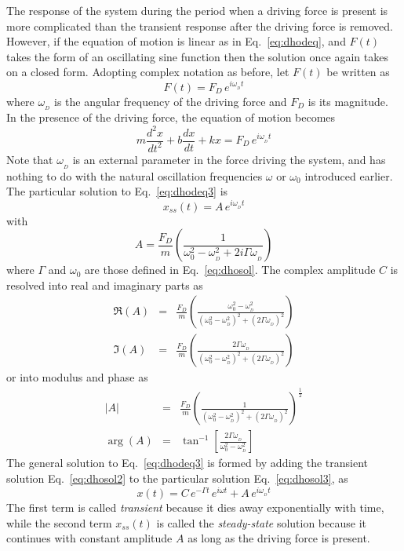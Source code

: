 \documentclass{revtex4}
\begin{document}
The response of the system during the period when a driving force is
present is more complicated than the transient response after the driving
force is removed.  However, if the equation of motion is linear as in
Eq.~\ref{eq:dhodeq}, and $F(t)$ takes the form of an oscillating sine
function then the solution once again takes on a closed form.  Adopting
complex notation as before, let $F(t)$ be written as
\begin{equation}
F(t) = F_D\,e^{i\omega_{_D} t}
\label{eq:F}
\end{equation}
where $\omega_{_D}$ is the angular frequency of the driving force and $F_D$
is its magnitude.  In the presence of the driving force, the equation of
motion becomes
\begin{equation}
m\frac{d^2 x}{dt^2}+b\frac{dx}{dt} + kx = F_D\,e^{i\omega_{_D} t}
\label{eq:dhodeq3}
\end{equation}
Note that $\omega_{_D}$ is an external parameter in the force driving
the system, and has nothing to do with the natural oscillation frequencies
$\omega$ or $\omega_0$ introduced earlier.  The particular solution to
Eq.~\ref{eq:dhodeq3} is
\begin{equation}
x_{ss}(t)=A\,e^{i\omega_{_D} t}
\label{eq:dhosol3}
\end{equation}
with
\begin{equation}
A=\frac{F_D}{m}\left(\frac{1}{\omega_0^2-\omega_{_D}^2+2i\Gamma\omega_{_D}}\right)
\label{eq:Aofw}
\end{equation}
where $\Gamma$ and $\omega_0$ are those defined in Eq.~\ref{eq:dhosol}.
The complex amplitude $C$ is resolved into real and imaginary parts as
\begin{eqnarray}
\Re(A)&=&\frac{F_D}{m}\left(\frac{\omega_0^2-\omega_{_D}^2}
{(\omega_0^2-\omega_{_D}^2)^2+(2\Gamma\omega_{_D})^2}\right) \nonumber \\
\Im(A)&=&\frac{F_D}{m}\left(\frac{2\Gamma\omega_{_D}}
{(\omega_0^2-\omega_{_D}^2)^2+(2\Gamma\omega_{_D})^2}\right)
\label{eq:AofwRI}
\end{eqnarray}
or into modulus and phase as
\begin{eqnarray}
|A|&=&\frac{F_D}{m}\left(\frac{1}
{(\omega_0^2-\omega_{_D}^2)^2+(2\Gamma\omega_{_D})^2}\right)^{\frac{1}{2}}
\nonumber \\
\arg(A)&=&\tan^{-1}\left[\frac{2\Gamma\omega_{_D}}{\omega_0^2-\omega_{_D}^2}\right]
\label{eq:AofwMP}
\end{eqnarray}
The general solution to Eq.~\ref{eq:dhodeq3} is formed by adding the
transient solution Eq.~\ref{eq:dhosol2} to the particular solution
Eq.~\ref{eq:dhosol3}, as
\begin{equation}
x(t) = C\,e^{-\Gamma t}\,e^{i\omega t} + A\,e^{i\omega_{_D} t}
\label{eq:dhosol4}
\end{equation}
The first term is called {\em transient} because it dies away exponentially
with time, while the second term $x_{ss}(t)$ is called the {\em steady-state}
solution because it continues with constant amplitude $A$ as long as the
driving force is present.
\end{document}
